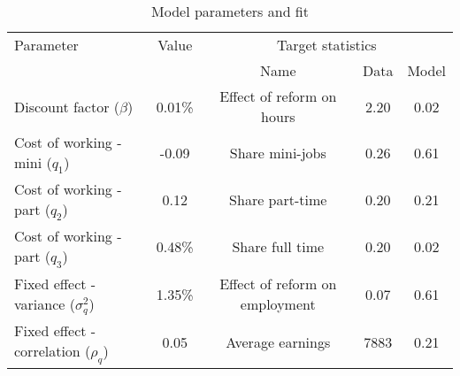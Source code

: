 \begin{table}[htbp]\caption{Model parameters and fit}\label{table:model_param}\centering\footnotesize\begin{tabular}{lcccc} \toprule  Parameter & Value & \multicolumn{3}{c}{Target statistics}  \\\cline{3-5}  &  &  Name & Data & Model  \\\midrule    Discount factor ($\beta$)      &0.01\%& Effect of reform on hours   & 2.20 &0.02\\ Cost of working - mini ($q_1$)   &-0.09& Share mini-jobs                  & 0.26 &0.61\\ Cost of working - part ($q_2$)   &0.12& Share part-time             & 0.20 &0.21\\ Cost of working - part ($q_3$)      &0.48\%& Share full time   & 0.20 &0.02\\ Fixed effect - variance ($\sigma^2_q$)   &1.35\%& Effect of reform on employment   & 0.07&0.61\\ Fixed effect - correlation ($\rho_q$)   &0.05& Average earnings             & 7883 &0.21\\  \bottomrule\end{tabular}\end{table}